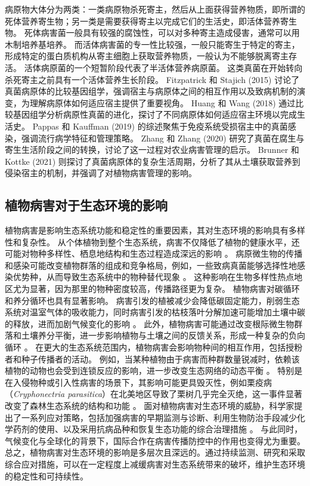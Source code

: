 \documentclass[AutoFakeBold]{LZUThesis-PgD&PhD}
\begin{document}
病原物大体分为两类：一类病原物杀死寄主，然后从上面获得营养物质，即所谓的死体营养寄生物；另一类是需要获得寄主以完成它们的生活史，即活体营养寄生物。
死体病害菌一般具有较强的腐蚀性，可以对多种寄主造成侵害，通常可以用木制培养基培养。
而活体病害菌的专一性比较强，一般只能寄生于特定的寄主，形成特定的蛋白质机构从寄主细胞上获取营养物质，一般认为不能够脱离寄主存活。
活体病原菌的一个短暂阶段代表了半活体营养病原菌。
这类真菌在开始转向杀死寄主之前具有一个活体营养生长阶段。
Fitzpatrick 和 Stajich (2015) 讨论了真菌病原体的比较基因组学，强调宿主与病原体之间的相互作用以及致病机制的演变，为理解病原体如何适应宿主提供了重要视角\cite{fitzpatrick2015comparative}。
Huang 和 Wang (2018) 通过比较基因组学分析病原性真菌的进化，探讨了不同病原体如何适应宿主环境以完成生活史\cite{huang2018evolution}。
Pappas 和 Kauffman (2019) 的综述聚焦于免疫系统受损宿主中的真菌感染，强调流行病学特征和管理策略\cite{pappas2019fungal}。
Zhang 和 Zhang (2020) 研究了真菌在腐生与寄生生活阶段之间的转换，讨论了这一过程对农业病害管理的启示\cite{zhang2020fungi}。
Brunner 和 Kottke (2021) 则探讨了真菌病原体的复杂生活周期，分析了其从土壤获取营养到侵染宿主的机制，并强调了对植物病害管理的影响\cite{brunner2021complex}。


\subsection{植物病害对于生态环境的影响}

植物病害是影响生态系统功能和稳定性的重要因素，其对生态环境的影响具有多样性和复杂性。
从个体植物到整个生态系统，病害不仅降低了植物的健康水平，还可能对物种多样性、栖息地结构和生态过程造成深远的影响 \cite{Mitchell2002}。
病原微生物的传播和感染可能改变植物群落的组成和竞争格局，例如，一些致病真菌能够选择性地感染优势种，从而导致生态系统中的物种替代现象 \cite{Garrett2006}。
这种影响在生物多样性热点地区尤为显著，因为那里的物种密度较高，传播路径更为复杂。
植物病害对碳循环和养分循环也具有显著影响。
病害引发的植被减少会降低碳固定能力，削弱生态系统对温室气体的吸收能力，同时病害引发的枯枝落叶分解加速可能增加土壤中碳的释放，进而加剧气候变化的影响 \cite{Allison2008}。
此外，植物病害可能通过改变根际微生物群落和土壤养分平衡，进一步影响植物与土壤之间的反馈关系，形成一种复杂的负向循环 \cite{Bever2010}。
在更大的生态系统范围内，植物病害会影响物种间的相互作用，包括授粉者和种子传播者的活动。
例如，当某种植物由于病害而种群数量锐减时，依赖该植物的动物也会受到连锁反应的影响，进一步改变生态网络的动态平衡 \cite{Maron2011}。
特别是在入侵物种或引入性病害的场景下，其影响可能更具毁灭性，例如栗疫病（\textit{Cryphonectria parasitica}）在北美地区导致了栗树几乎完全灭绝，这一事件显著改变了森林生态系统的结构和功能 \cite{Anagnostakis1987}。
面对植物病害对生态环境的威胁，科学家提出了一系列应对策略，包括加强病害的早期监测与诊断、利用生物防治手段减少化学药剂的使用、以及采用抗病品种和恢复生态功能的综合治理措施 \cite{Pautasso2010}。
与此同时，气候变化与全球化的背景下，国际合作在病害传播防控中的作用也变得尤为重要。
总之，植物病害对生态环境的影响是多层次且深远的。通过持续监测、研究和采取综合应对措施，可以在一定程度上减缓病害对生态系统带来的破坏，维护生态环境的稳定性和可持续性。
\end{document}
